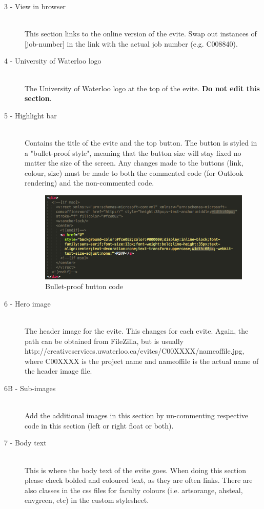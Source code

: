 \documentclass[a4paper,11pt]{article}
\begin{document}
	\begin{description}
		\item[3 - View in browser] \hfill \\
		This section links to the online version of the evite. Swap out instances of [job-number] in the link with the actual job number (e.g. C008840).
		\item[4 - University of Waterloo logo] \hfill \\
		The University of Waterloo logo at the top of the evite. \textbf{Do not edit this section}.
		\item[5 - Highlight bar] \hfill \\
		Contains the title of the evite and the top button. The button is styled in a "bullet-proof style", meaning that the button size will stay fixed no matter the size of the screen. Any changes made to the buttons (link, colour, size) must be made to both the commented code (for Outlook rendering) and the non-commented code.
			\begin{figure}[ht]
			\centering
			\includegraphics[width=\textwidth]{images/buttoncode}
			\caption{Bullet-proof button code}
			\label{fig:Two}
			\end{figure}
		\item[6 - Hero image] \hfill \\
		The header image for the evite. This changes for each evite. Again, the path can be obtained from FileZilla, but is usually http://creativeservices.uwaterloo.ca/evites/C00XXXX/nameoffile.jpg, where C00XXXX is the project name and nameoffile is the actual name of the header image file.
		\item[6B - Sub-images] \hfill \\
		Add the additional images in this section by un-commenting respective code in this section (left or right float or both).
		\item[7 - Body text] \hfill \\
		This is where the body text of the evite goes. When doing this section please check bolded and coloured text, as they are often links. There are also classes in the css files for faculty colours (i.e. artsorange, ahsteal, envgreen, etc) in the custom stylesheet.

\end{description}
\end{document}
